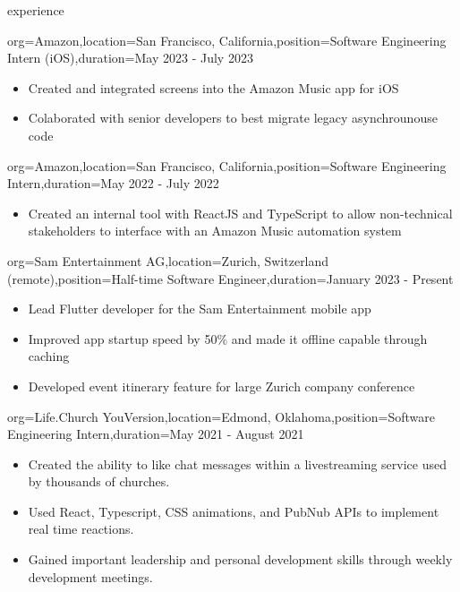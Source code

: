 \documentclass{resume}
\begin{document}
\begin{ResumeSection}{experience}
    \begin{ResumeSubsection}{org={Amazon},location={San Francisco,
        California},position={Software Engineering Intern (iOS)},duration={May 2023 -
    July 2023}}
        \begin{itemize}
            \item Created and integrated screens into the Amazon Music app for iOS
            \item Colaborated with senior developers to best migrate legacy
                asynchrounouse code
        \end{itemize}
    \end{ResumeSubsection}
    \begin{ResumeSubsection}{org={Amazon},location={San Francisco, California},position={Software Engineering Intern},duration={May 2022 - July 2022}}
        \begin{itemize}
            \item Created an internal tool with ReactJS and TypeScript to allow
                non-technical stakeholders to interface with an Amazon Music automation
                system
        \end{itemize}
    \end{ResumeSubsection}

    \begin{ResumeSubsection}{org={Sam Entertainment AG},location={Zurich,
        Switzerland (remote)},position={Half-time Software Engineer},duration={January
    2023 - Present}}
        \begin{itemize}
            \item Lead Flutter developer for the Sam Entertainment mobile app
            \item Improved app startup speed by 50\% and made it offline capable
                through caching
            \item Developed event itinerary feature for large Zurich company
                conference
        \end{itemize}
    \end{ResumeSubsection}

    \begin{ResumeSubsection}{org={Life.Church YouVersion},location={Edmond, Oklahoma},position={Software Engineering Intern},duration={May 2021 - August 2021}}
        \begin{itemize}
            \item {Created the ability to like chat messages within a livestreaming service used by
                thousands of churches.}
            \item {Used React, Typescript, CSS animations, and
                PubNub APIs to implement real time reactions.}
            \item Gained important leadership and personal development skills
                through weekly development meetings.
        \end{itemize}
    \end{ResumeSubsection}


\end{ResumeSection}
\end{document}
